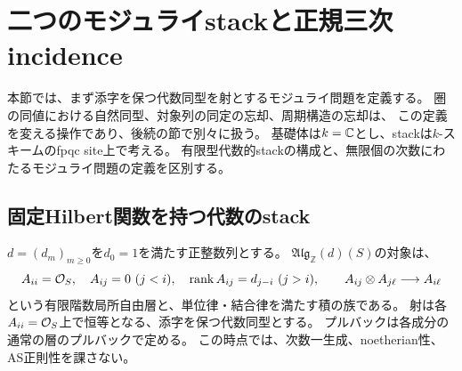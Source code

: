 \section{二つのモジュライstackと正規三次incidence}
\label{sec:algebraic-moduli-foundations}

本節では、まず添字を保つ代数同型を射とするモジュライ問題を定義する。
圏の同値における自然同型、対象列の同定の忘却、周期構造の忘却は、
この定義を変える操作であり、後続の節で別々に扱う。
基礎体は$k=\mathbb C$とし、stackは$k$-スキームのfpqc site上で考える。
有限型代数的stackの構成と、無限個の次数にわたるモジュライ問題の定義を区別する。

\subsection{固定Hilbert関数を持つ代数のstack}

$d=(d_m)_{m\geq0}$を$d_0=1$を満たす正整数列とする。
$\mathfrak{Alg}_{\mathbb Z}(d)(S)$の対象は、
\begin{equation}\label{eq:moduli-z-family}
 A_{ii}=\mathcal O_S,\quad A_{ij}=0\ (j<i),\quad
 \operatorname{rank} A_{ij}=d_{j-i}\ (j>i),\qquad
 A_{ij}\otimes A_{j\ell}\longrightarrow A_{i\ell}
\end{equation}
という有限階数局所自由層と、単位律・結合律を満たす積の族である。
射は各$A_{ii}=\mathcal O_S$上で恒等となる、添字を保つ代数同型とする。
プルバックは各成分の通常の層のプルバックで定める。
この時点では、次数一生成、noetherian性、AS正則性を課さない。

